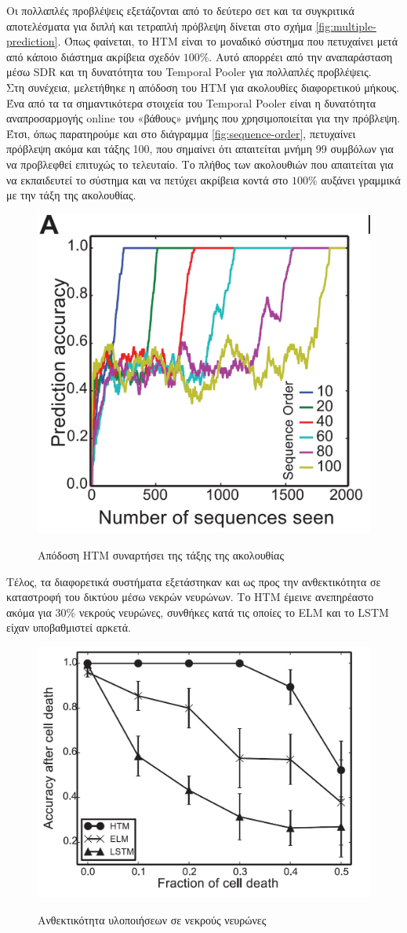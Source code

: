Οι πολλαπλές προβλέψεις εξετάζονται από το δεύτερο σετ και τα συγκριτικά αποτελέσματα για διπλή και τετραπλή πρόβλεψη δίνεται στο σχήμα \eqref{fig:multiple-prediction}.
Όπως φαίνεται, το HTM είναι το μοναδικό σύστημα που πετυχαίνει μετά από κάποιο διάστημα ακρίβεια σχεδόν $100\%$.
Αυτό απορρέει από την αναπαράσταση μέσω SDR και τη δυνατότητα του Temporal Pooler για πολλαπλές προβλέψεις.\\
Στη συνέχεια, μελετήθηκε η απόδοση του HTM για ακολουθίες διαφορετικού μήκους.
Ένα από τα τα σημαντικότερα στοιχεία του Temporal Pooler είναι η δυνατότητα αναπροσαρμογής online του «βάθους» μνήμης που χρησιμοποιείται για την πρόβλεψη.
Έτσι, όπως παρατηρούμε και στο διάγραμμα \eqref{fig:sequence-order}, πετυχαίνει πρόβλεψη ακόμα και τάξης 100, που σημαίνει ότι απαιτείται μνήμη 99 συμβόλων για να προβλεφθεί επιτυχώς το τελευταίο.
Το πλήθος των ακολουθιών που απαιτείται για να εκπαιδευτεί το σύστημα και να πετύχει ακρίβεια κοντά στο $100\%$ αυξάνει γραμμικά με την τάξη της ακολουθίας.
\begin{figure}[H]
	\centering%
	{\includegraphics[width=0.4\columnwidth,clip=true]{figures/vlsi/sequence_order.jpg}}
	\caption{Απόδοση HTM συναρτήσει της τάξης της ακολουθίας} \label{fig:sequence-order}
\end{figure}

Τέλος, τα διαφορετικά συστήματα εξετάστηκαν και ως προς την ανθεκτικότητα σε καταστροφή του δικτύου μέσω νεκρών νευρώνων.
Το HTM έμεινε ανεπηρέαστο ακόμα για $30\%$ νεκρούς νευρώνες, συνθήκες κατά τις οποίες το ELM και το LSTM είχαν υποβαθμιστεί αρκετά.

\begin{figure}[H]
	\centering%
	{\includegraphics[width=0.4\columnwidth,clip=true]{figures/vlsi/cell_death.jpg}}
	\caption{Ανθεκτικότητα υλοποιήσεων σε νεκρούς νευρώνες} \label{fig:cell-death}
\end{figure}


